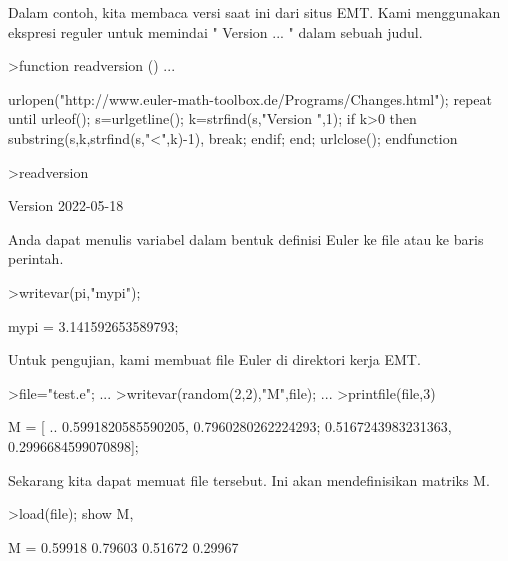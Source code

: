 \documentclass[a4paper,10pt]{article}
\begin{document}
\begin{eulernotebook}
\begin{eulercomment}
\begin{eulercomment}
\begin{eulercomment}
\begin{eulercomment}
\begin{eulercomment}
Dalam contoh, kita membaca versi saat ini dari situs EMT. Kami
menggunakan ekspresi reguler untuk memindai " Version ... " dalam
sebuah judul.
\end{eulercomment}
\begin{eulerprompt}
>function readversion () ...
\end{eulerprompt}
\begin{eulerudf}
  urlopen("http://www.euler-math-toolbox.de/Programs/Changes.html");
  repeat
    until urleof();
    s=urlgetline();
    k=strfind(s,"Version ",1);
    if k>0 then substring(s,k,strfind(s,"<",k)-1), break; endif;
  end;
  urlclose();
  endfunction
\end{eulerudf}
\begin{eulerprompt}
>readversion
\end{eulerprompt}
\begin{euleroutput}
  Version 2022-05-18
\end{euleroutput}
\begin{eulercomment}
Anda dapat menulis variabel dalam bentuk definisi Euler ke file atau
ke baris perintah.
\end{eulercomment}
\begin{eulerprompt}
>writevar(pi,"mypi");
\end{eulerprompt}
\begin{euleroutput}
  mypi = 3.141592653589793;
\end{euleroutput}
\begin{eulercomment}
Untuk pengujian, kami membuat file Euler di direktori kerja EMT.
\end{eulercomment}
\begin{eulerprompt}
>file="test.e"; ...
>writevar(random(2,2),"M",file); ...
>printfile(file,3)
\end{eulerprompt}
\begin{euleroutput}
  M = [ ..
  0.5991820585590205, 0.7960280262224293;
  0.5167243983231363, 0.2996684599070898];
\end{euleroutput}
\begin{eulercomment}
Sekarang kita dapat memuat file tersebut. Ini akan mendefinisikan
matriks M.
\end{eulercomment}
\begin{eulerprompt}
>load(file); show M,
\end{eulerprompt}
\begin{euleroutput}
  M = 
    0.59918   0.79603 
    0.51672   0.29967 
\end{euleroutput}

\end{eulercomment}
\end{eulercomment}
\end{eulercomment}
\end{eulercomment}
\end{eulernotebook}
\end{document}
